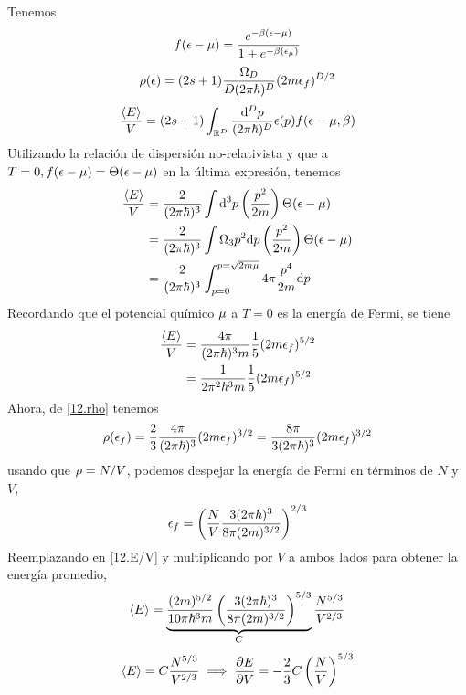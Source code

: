 \begin{sol}
	Tenemos
	\begin{equation}
  f(\epsilon-\mu )=\frac{e^{-\beta(\epsilon-\mu )}}{1+e^{-\beta(\epsilon_\mu )}}
\end{equation}
\begin{equation}\label{12.rho}
\rho(\epsilon )=(2s+1)\frac{\Omega_D}{D(2\pi\hbar)^D}(2m\epsilon_f)^{D/2}
\end{equation}
\begin{equation}
  \frac{\ev{E}}{V}=(2s+1)\int_{\mathbb{R}^D}\frac{\dd^Dp}{(2\p\hbar)^D}\epsilon(p)f(\ep-\m ,\b )
\end{equation}
Utilizando la relación de dispersión no-relativista y que a $T=0, f(\epsilon-\mu )=\Theta(\epsilon-\mu )$ en la última expresión, tenemos
\begin{align}
  \frac{\ev{E}}{V}&=\frac{2}{(2\p\hbar)^3}\int\dd^3p\left(\frac{p^2}{2m}\right)\Th (\ep-\m )\\
  &=\frac{2}{(2\p\hbar)^3}\int\Omega_3p^2\dd p\left(\frac{p^2}{2m}\right)\Th (\ep-\m )\\
  &=\frac{2}{(2\p\hbar)^3}\int_{p=0}^{p=\sqrt{2m\m }}4\p \frac{p^4}{2m}\dd p
\end{align}
Recordando que el potencial químico $\mu$ a $T=0$ es la energía de Fermi, se tiene
\begin{align}
   \frac{\ev{E}}{V}&=\frac{4\p }{(2\p\hbar)^3m}\frac{1}{5}(2m\ep_f )^{5/2}\\
   &=\frac{1}{2\p^2\hbar^3 m}\frac{1}{5}(2m\ep_f )^{5/2}\label{12.E/V}
\end{align}
Ahora, de \eqref{12.rho} tenemos
\begin{equation}
  \rho(\epsilon_f)=\frac{2}{3}\frac{4\pi }{(2\pi \hbar)^3}(2m\epsilon_f)^{3/2}=\frac{8\pi }{3(2\pi \hbar)^3}(2m\epsilon_f)^{3/2}
\end{equation}
usando que $\rho=N/V$, podemos despejar la energía de Fermi en términos de $N$ y $V$,
\begin{equation}
  \epsilon_f=\left(\frac{N}{V}\frac{3(2\pi\hbar)^3}{8\pi (2m)^{3/2}}\right)^{2/3}
\end{equation}
Reemplazando en \eqref{12.E/V} y multiplicando por $V$ a ambos lados para obtener la energía promedio,
\begin{equation}
  \ev{E}=\underbrace{\frac{(2m)^{5/2}}{10\p\hbar^3m}\left(\frac{3(2\p\hbar)^3}{8\p (2m)^{3/2}}\right)^{5/3}}_{C}\frac{N^{5/3}}{V^{2/3}}
\end{equation}
\begin{equation}
  \ev{E}=C\frac{N^{5/3}}{V^{2/3}}\implies \pdv{E}{V}=-\frac{2}{3}C\left(\frac{N}{V}\right)^{5/3}

\end{equation}
\end{sol}
